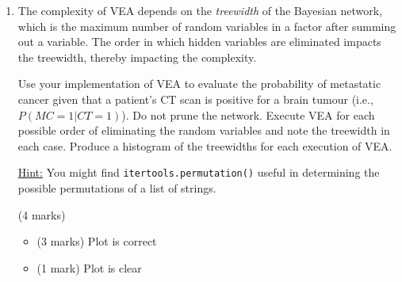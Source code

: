 \documentclass[12pt]{article}
\begin{document}
\begin{enumerate}[font=\Large,label=(\alph*)]
\begin{markscheme}
(2 marks)

\begin{itemize}
\item (2 marks) Correct answer
\end{itemize}
\end{markscheme}

\item
The complexity of VEA depends on the \textit{treewidth} of the Bayesian network, which is the maximum number of random variables in a factor after summing out a variable. The order in which hidden variables are eliminated impacts the treewidth, thereby impacting the complexity.

Use your implementation of VEA to evaluate the probability of metastatic cancer given that a patient's CT scan is positive for a brain tumour (i.e., $P(MC=1|CT=1)$). Do not prune the network. Execute VEA for each possible order of eliminating the random variables and note the treewidth in each case. Produce a histogram of the treewidths for each execution of VEA.

\underline{Hint:} You might find \verb+itertools.permutation()+ useful in determining the possible permutations of a list of strings.

\newpage
\begin{markscheme}
(4 marks)

\begin{itemize}
\item (3 marks) Plot is correct
\item (1 mark) Plot is clear
\end{itemize}
\end{markscheme}


\end{enumerate}
\end{document}
